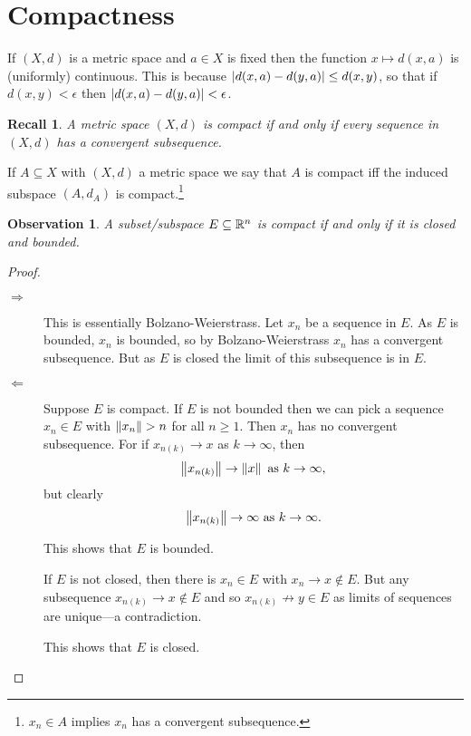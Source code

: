 \documentclass{notes}
\theoremstyle{plain}
\newtheorem{observation}[proposition]{Observation}
\newtheorem*{recall}{Recall}
\begin{document}
\section{Compactness}

If $ (X,d) $ is a metric space and $ a \in X $ is fixed then the
function $x \mapsto d(x,a)$ is (uniformly) continuous.  This is
because $\left|d(x,a) -d(y,a)\right| \leq d(x,y)$, so that if $
d(x,y)<\epsilon $ then $\left|d(x,a)-d(y,a)\right|<\epsilon$.

\begin{recall}
A metric space $ (X,d) $ is compact if and only if every sequence in 
$ (X,d) $ has a convergent subsequence.
\end{recall}

If $ A\subseteq X $ with $ (X,d) $ a metric space we say 
that $ A $ is compact iff the induced subspace $ (A,d_{A}) $ is 
compact.\footnote{ $ x_{n} \in A$ implies $ x_{n}$ has a convergent
subsequence.}

\begin{observation}
A subset/subspace $ E \subseteq \mathbb{R}^{n}$ is compact if and only if it 
is closed and bounded.
\end{observation}

\begin{proof}
\

\begin{description}

\item[$\Rightarrow$] This is essentially Bolzano-Weierstrass.
Let $ x_{n} $ be a sequence in $ E $.
As $ E  $ is bounded, $ x_{n}  $ is bounded, so by 
Bolzano-Weierstrass $ x_{n}  $ has a convergent subsequence.
But as $ E $ is closed the limit of this subsequence is in $E$.

\item[$ \Leftarrow $] Suppose $ E $ is compact.
If $ E $ is not bounded then we can pick a sequence $ x_{n} \in E $ with $ 
\norm{x_{n}}>n $ for all $ n \geq 1 $. Then $ x_{n} $ has no 
convergent subsequence. For if $ x_{n(k)}\to x $ as $ k 
\to \infty $, then
\[ \left\|x_{n(k)}\right\| \to \left\|x\right\| \text{ as } k \to \infty,
\]
 but clearly
\[
\left\|x_{n(k)}\right\| \to \infty \text{ as } k \to \infty.
\]

This shows that $ E  $ is bounded.

If $ E $ is not closed, then there is $ x_{n} \in E $ with
$x_{n} \to x \not\in E$.
But any subsequence
$x_{n(k)} \to x \not\in E$ and so 
$x_{n(k)} \not\to y \in E$ as limits of sequences are 
unique---a contradiction.

This shows that $ E $ is closed.
\end{description}
\end{proof}
\end{document}

